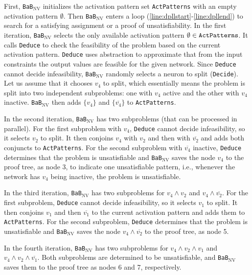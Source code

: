 \documentclass[oneside,11pt,dvipsnames]{book}
\newcommand{\functiontextformat}[1]{\textrm{\texttt{#1}}}
\newcommand{\dd}{\texttt{BaB$_{\text{NV}}$}}
\begin{document}
First, \dd{} initializes the activation pattern set \functiontextformat{ActPatterns} with an empty activation pattern $\emptyset$. Then \dd{} enters a loop (\autoref{line:dpllstart}-\autoref{line:dpllend}) to search for a satisfying assignment or a proof of unsatisfiability. In the first iteration, \dd{} selects the only available activation pattern $\emptyset \in \functiontextformat{ActPatterns}$. 
It calls \functiontextformat{Deduce} to check the feasibility of the problem based on the current activation pattern. \functiontextformat{Deduce} uses abstraction to approximate that from the input constraints the output values are feasible for the given network. 
Since \functiontextformat{Deduce} cannot decide infeasibility, \dd{} randomly selects a neuron to split (\functiontextformat{Decide}). Let us assume that it chooses $v_4$ to split, which essentially means the problem is split into two independent subproblems: one with $v_4$ active and the other with $v_4$ inactive.
\dd{} then adds $\{v_4\}$ and $\{\overline{v_4}\}$ to \functiontextformat{ActPatterns}.

In the second iteration, \dd{} has two subproblems (that can be processed in parallel). For the first subproblem with $v_4$, \functiontextformat{Deduce} cannot decide infeasibility, so it selects $v_2$ to split. It then conjoins $v_4$ with $v_2$ and then with $\overline{v_2}$ and adds both conjuncts to \texttt{ActPatterns}. 
For the second subproblem with $\overline{v_4}$ inactive, \functiontextformat{Deduce} determines that the problem is unsatisfiable and \dd{} saves the node $v_4$ to the proof tree, as node 3, to indicate one unsatisfiable pattern, i.e., whenever the network has $v_4$ being inactive, the problem is unsatisfiable.

In the third iteration, \dd{} has two subproblems for $v_4 \land v_2$ and $v_4 \land \overline{v_2}$. For the first subproblem, \functiontextformat{Deduce} cannot decide infeasibility, so it selects $v_1$ to split. It then conjoins $v_1$ and then $\overline{v_1}$ to the current activation pattern and adds them to \functiontextformat{ActPatterns}. For the second subproblem, \functiontextformat{Deduce} determines that the problem is unsatisfiable and \dd{} saves the node $v_4 \land \overline{v_2}$ to the proof tree, as node 5.

In the fourth iteration, \dd{} has two subproblems for $v_4 \land v_2 \land v_1$ and $v_4 \land v_2 \land \overline{v_1}$. Both subproblems are determined to be unsatisfiable, and \dd{} saves them to the proof tree as nodes 6 and 7, respectively.
\end{document}
